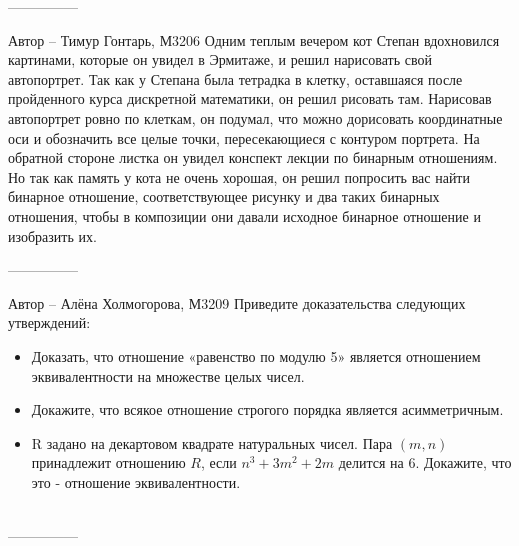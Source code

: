 \documentclass[10pt]{exam}
\begin{document}
\begin{questions}
---------------

Автор -- Тимур Гонтарь, М3206\question
Одним теплым вечером кот Степан вдохновился картинами, которые он увидел в Эрмитаже, и решил нарисовать свой автопортрет. Так как у Степана была тетрадка в клетку, оставшаяся после пройденного курса дискретной математики, он решил рисовать там. Нарисовав автопортрет ровно по клеткам, он подумал, что можно дорисовать координатные оси и обозначить все целые точки, пересекающиеся с контуром портрета. На обратной стороне листка он увидел конспект лекции по бинарным отношениям. Но так как память у кота не очень хорошая, он решил попросить вас найти бинарное отношение, соответствующее рисунку и два таких бинарных отношения, чтобы в композиции они давали исходное бинарное отношение и изобразить их.
\\
\begin{figure}[h]

\begin{minipage}[h]{0.55\linewidth}
\end{minipage}
\begin{minipage}[h]{0.45\linewidth}
\end{minipage}
\end{figure}



---------------

Автор -- Алёна Холмогорова, М3209\question
Приведите доказательства следующих утверждений:
\begin{itemize}
    \item Доказать, что отношение «равенство по модулю 5» является отношением эквивалентности на множестве целых чисел.
    \item Докажите, что всякое отношение строгого порядка является асимметричным.
    \item R задано на декартовом квадрате натуральных чисел. Пара $(m,n)$ принадлежит отношению $R$, если $n^3 + 3m^2 + 2m$ делится на 6. Докажите, что это - отношение эквивалентности.
\end{itemize}
\\
---------------


\end{questions}
\end{document}
